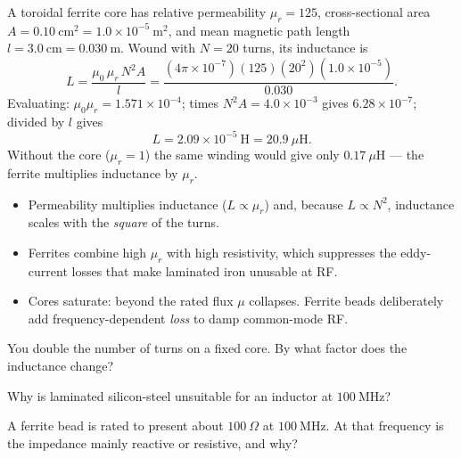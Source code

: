 \begin{workedexample}
A toroidal ferrite core has relative permeability $\mu_r = 125$, cross-sectional
area $A = 0.10\ \mathrm{cm^{2}} = 1.0\times10^{-5}\ \mathrm{m^{2}}$, and mean
magnetic path length $l = 3.0\ \mathrm{cm} = 0.030\ \mathrm{m}$. Wound with
$N = 20$ turns, its inductance is
\[ L = \frac{\mu_0\,\mu_r\,N^{2}A}{l}
     = \frac{(4\pi\times10^{-7})(125)(20^{2})(1.0\times10^{-5})}{0.030}. \]
Evaluating: $\mu_0\mu_r = 1.571\times10^{-4}$; times $N^2A = 4.0\times10^{-3}$
gives $6.28\times10^{-7}$; divided by $l$ gives
\[ L = 2.09\times10^{-5}\ \mathrm{H} = 20.9\ \mu\mathrm{H}. \]
Without the core ($\mu_r = 1$) the same winding would give only $0.17\ \mu\mathrm{H}$
--- the ferrite multiplies inductance by $\mu_r$.
\end{workedexample}

\begin{keytakeaways}
\begin{itemize}[leftmargin=1.4em,itemsep=2pt]
\item Permeability multiplies inductance ($L \propto \mu_r$) and, because
$L \propto N^{2}$, inductance scales with the \emph{square} of the turns.
\item Ferrites combine high $\mu_r$ with high resistivity, which suppresses the
eddy-current losses that make laminated iron unusable at RF.
\item Cores saturate: beyond the rated flux $\mu$ collapses. Ferrite beads
deliberately add frequency-dependent \emph{loss} to damp common-mode RF.
\end{itemize}
\end{keytakeaways}

\begin{exercises}
\item You double the number of turns on a fixed core. By what factor does the inductance change?
\item Why is laminated silicon-steel unsuitable for an inductor at $100\ \mathrm{MHz}$?
\item A ferrite bead is rated to present about $100\ \Omega$ at $100\ \mathrm{MHz}$.
At that frequency is the impedance mainly reactive or resistive, and why?
\end{exercises}

